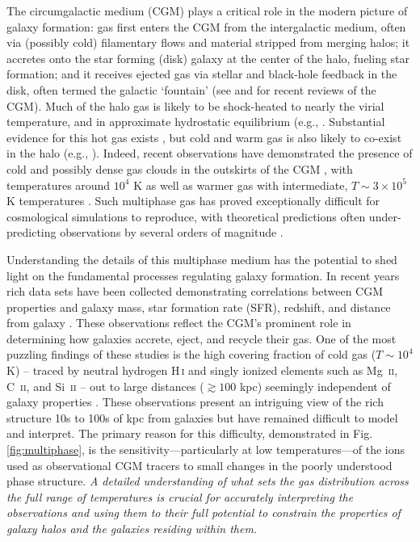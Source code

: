 \documentclass[11pt,letterpaper,english]{article}
\begin{document}
The circumgalactic medium (CGM) plays a critical role in the modern picture of galaxy formation: gas first enters the CGM from the intergalactic medium, often via (possibly cold) filamentary flows and material stripped from merging halos; it accretes onto the star forming (disk) galaxy at the center of the halo, fueling star formation; and it receives ejected gas via stellar and black-hole feedback in the disk, often termed the galactic `fountain' (see \cite{Tumlinson17} and \cite{Putman12} for recent reviews of the CGM).  Much of the halo gas is likely to be shock-heated to nearly the virial temperature, and in approximate hydrostatic equilibrium (e.g., \cite{White78, Fielding17}. Substantial evidence for this hot gas exists \cite{Bregman07}, but cold and warm gas is also likely to co-exist in the halo (e.g., \cite{Keres09, Wakker2009, Rigby02}). Indeed, recent observations have demonstrated the presence of cold and possibly dense gas clouds in the outskirts of the CGM \cite{Tumlinson13, Werk14, Lau16}, with temperatures around $10^4$ K as well as warmer gas with intermediate, $T \sim 3 \times 10^5$ K temperatures \cite{Chen2009, Prochaska2011}.  Such multiphase gas has proved exceptionally difficult for cosmological simulations to reproduce, with theoretical predictions often under-predicting observations by several orders of magnitude \cite{Hummels2013}.  

Understanding the details of this multiphase medium has the potential to shed light on the fundamental processes regulating galaxy formation. In recent years rich data sets have been collected demonstrating correlations between CGM properties and galaxy mass, star formation rate (SFR), redshift, and distance from galaxy \cite{Tumlinson11, Bordoloi14, Borthakur15}. These observations reflect the CGM's prominent role in determining how galaxies accrete, eject, and recycle their gas. One of the most puzzling findings of these studies is the high covering fraction of cold gas ($T\sim10^4$ K) -- traced by neutral hydrogen H\,\textsc{i} and singly ionized elements such as Mg\ \textsc{ii}, C\ \textsc{ii}, and Si\ \textsc{ii} -- out to large distances ($\gtrsim 100$ kpc) seemingly independent of galaxy properties \cite{Thom12}. These observations present an intriguing view of the rich structure 10s to 100s of kpc from galaxies but have remained difficult to model and interpret. The primary reason for this difficulty, demonstrated in Fig.\,\ref{fig:multiphase}, 
is the sensitivity---particularly at low temperatures---of the ions used as observational CGM tracers to small changes in the poorly understood phase structure. 
\textit{A detailed understanding of what sets the gas distribution across the full range of temperatures is crucial for accurately interpreting the observations and using them to their full potential to constrain the properties of galaxy halos and the galaxies residing within them.}
\end{document}
